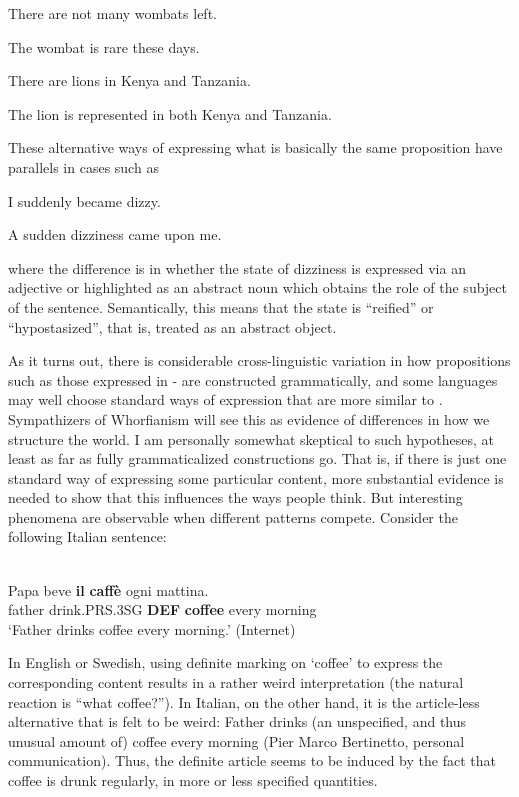 \ea
\gl There are not many wombats left.  
 \z

\ea 
\gl The wombat is rare these days.
\z 

\ea 
\gl There are lions in Kenya and Tanzania.
\z 

\ea
\gl The lion is represented in both Kenya and Tanzania. 
\z 

These alternative ways of expressing what is basically the same proposition have parallels in cases such as

\ea
\gl \label{bkm:Ref107116648}I suddenly became dizzy.  
 \z

\ea 
\gl \label{bkm:Ref107116651}A sudden dizziness came upon me.
\z 

where the difference is in whether the state of dizziness is expressed via an adjective or highlighted as an abstract noun which obtains the role of the subject of the sentence. Semantically, this means that the state is “reified” or “hypostasized”, that is, treated as an abstract object. 

As it turns out, there is considerable cross-linguistic variation in how propositions such as those expressed in - are constructed grammatically, and some languages may well choose standard ways of expression that are more similar to . Sympathizers of Whorfianism will see this as evidence of differences in how we structure the world. I am personally somewhat skeptical to such hypotheses, at least as far as fully grammaticalized constructions go. That is, if there is just one standard way of expressing some particular content, more substantial evidence is needed to show that this influences the ways people think. But interesting phenomena are observable when different patterns compete. Consider the following Italian sentence:

\ea \label{} 
\\
\gll Papa  beve  \textbf{il} \textbf{caffè} ogni  mattina.\\
father  drink.PRS.3SG  \textbf{DEF} \textbf{coffee} every  morning\\
\glt ‘Father drinks coffee every morning.’ (Internet)

\z

In English or Swedish, using definite marking on ‘coffee’ to express the corresponding content results in a rather weird interpretation (the natural reaction is “what coffee?”). In Italian, on the other hand, it is the article-less alternative that is felt to be weird: Father drinks (an unspecified, and thus unusual amount of) coffee every morning (Pier Marco Bertinetto, personal communication). Thus, the definite article seems to be induced by the fact that coffee is drunk regularly, in more or less specified quantities. 

